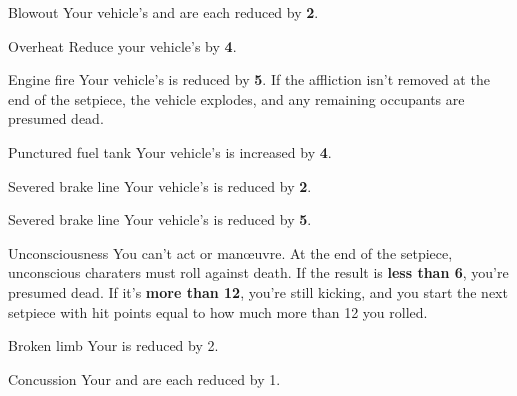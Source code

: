 
\begin{describe}{Blowout}
  Your vehicle's  and  are each reduced by \textbf{2}.
\end{describe}

\begin{describe}{Overheat}
  Reduce your vehicle's  by \textbf{4}.
\end{describe}

\begin{describe}{Engine fire}
  Your vehicle's  is reduced by \textbf{5}. If the affliction isn't removed at the end of the setpiece, the vehicle explodes, and any remaining occupants are presumed dead.
\end{describe}

\begin{describe}{Punctured fuel tank}
  Your vehicle's  is increased by \textbf{4}.
\end{describe}

\begin{describe}{Severed brake line}
  Your vehicle's  is reduced by \textbf{2}.
\end{describe}

\begin{describe}{Severed brake line}
  Your vehicle's  is reduced by \textbf{5}.
\end{describe}

\hr

\begin{describe}{Unconsciousness}
  You can't act or man\oe{}uvre. At the end of the setpiece, unconscious charaters must roll  against death. If the result is \textbf{less than 6}, you're presumed dead. If it's \textbf{more than 12}, you're still kicking, and you start the next setpiece with hit points equal to how much more than 12 you rolled.
\end{describe}

\begin{describe}{Broken limb}
  Your  is reduced by 2.
\end{describe}

\begin{describe}{Concussion}
  Your  and  are each reduced by 1.
\end{describe}

